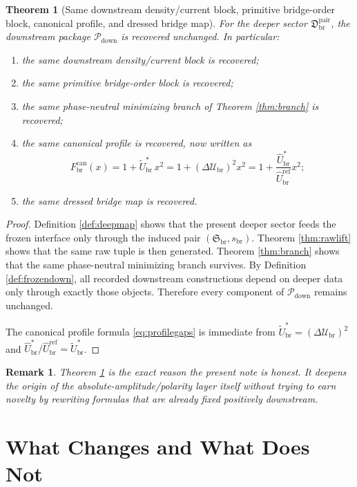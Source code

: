 \documentclass[11pt]{article}
\newcommand{\RespShapeEq}{\widetilde U_{\mathrm{br}}^{\ast}}
\newcommand{\RespRawRef}{\widehat U_{\mathrm{br}}^{\mathrm{ref}}}
\newcommand{\RespRawEq}{\widehat U_{\mathrm{br}}^{\ast}}
\newcommand{\CurvProfileCan}{F_{\mathrm{br}}^{\mathrm{can}}}
\newcommand{\DownPkg}{\mathscr P_{\mathrm{down}}}
\newcommand{\ShapeTuple}{\mathfrak S_{\mathrm{br}}}
\newcommand{\ScaleMod}{s_{\mathrm{br}}}
\newcommand{\PairSector}{\mathfrak D_{\mathrm{br}}^{\mathrm{pair}}}
\newcommand{\GapEq}{\Delta \mathcal U_{\mathrm{br}}}
\newtheorem{remark}{Remark}
\newtheorem{theorem}{Theorem}
\begin{document}
\begin{theorem}[Same downstream density/current block, primitive bridge-order block, canonical profile, and dressed bridge map]
\label{thm:downstream}
For the deeper sector \(\PairSector\), the downstream package \(\DownPkg\) is recovered unchanged. In particular:
\begin{enumerate}
    \item the same downstream density/current block is recovered;
    \item the same primitive bridge-order block is recovered;
    \item the same phase-neutral minimizing branch of Theorem \ref{thm:branch} is recovered;
    \item the same canonical profile is recovered, now written as
    \begin{equation}
    \CurvProfileCan(x)
    =
    1+\RespShapeEq\,x^{2}
    =
    1+(\GapEq)^{2}x^{2}
    =
    1+\frac{\RespRawEq}{\RespRawRef}x^{2};
    \label{eq:profilegaps}
    \end{equation}
    \item the same dressed bridge map is recovered.
\end{enumerate}
\end{theorem}

\begin{proof}
Definition \ref{def:deepmap} shows that the present deeper sector feeds the frozen interface only through the induced pair \((\ShapeTuple,\ScaleMod)\). Theorem \ref{thm:rawlift} shows that the same raw tuple is then generated. Theorem \ref{thm:branch} shows that the same phase-neutral minimizing branch survives. By Definition \ref{def:frozendown}, all recorded downstream constructions depend on deeper data only through exactly those objects. Therefore every component of \(\DownPkg\) remains unchanged.

The canonical profile formula \eqref{eq:profilegaps} is immediate from \(\RespShapeEq=(\GapEq)^{2}\) and \(\RespRawEq/\RespRawRef=\RespShapeEq\).
\end{proof}

\begin{remark}
Theorem \ref{thm:downstream} is the exact reason the present note is honest. It deepens the origin of the absolute-amplitude/polarity layer itself without trying to earn novelty by rewriting formulas that are already fixed positively downstream.
\end{remark}

\section{What Changes and What Does Not}
\end{document}

